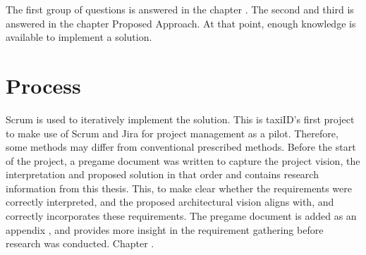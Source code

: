 The first group of questions is answered in the chapter . The second and third is answered in the chapter Proposed Approach. At that point, enough knowledge is available to implement a solution.

\section{Process}

Scrum is used to iteratively implement the solution. This is taxiID's first project to make use of Scrum and Jira for project management as a pilot. Therefore, some methods may differ from conventional prescribed methods. Before the start of the project, a pregame document was written to capture the project vision, the interpretation and proposed solution in that order and contains research information from this thesis. This, to make clear whether the requirements were correctly interpreted, and the proposed architectural vision aligns with, and correctly incorporates these requirements. The pregame document is added as an appendix , and provides more insight in the requirement gathering before research was conducted. Chapter .
